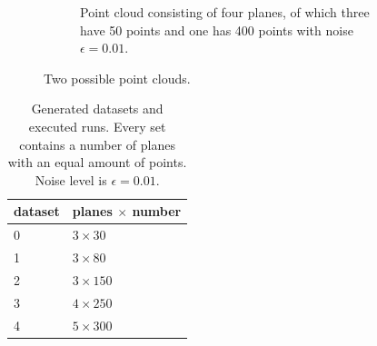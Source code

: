 \begin{figure}
\begin{subfigure}{.45\textwidth}
        \caption{Point cloud consisting of four planes, of which three have 50 points and one has 400 points with noise $\epsilon=0.01$.}
    \end{subfigure}
    \caption{Two possible point clouds.} \label{fig:point_cloud_examples}
\end{figure}

\begin{table}
    \centering
    \begin{tabular}{l|l}
        dataset & planes $\times$ number \\
        \hline
        0 & $3 \times 30  $ \\
        1 & $3 \times 80  $ \\
        2 & $3 \times 150 $ \\
        3 & $4 \times 250 $ \\
        4 & $5 \times 300 $
    \end{tabular}
    \caption{Generated datasets and executed runs. Every set contains a number of planes with an equal amount of points. Noise level is $\epsilon = 0.01$.}
\end{table}

